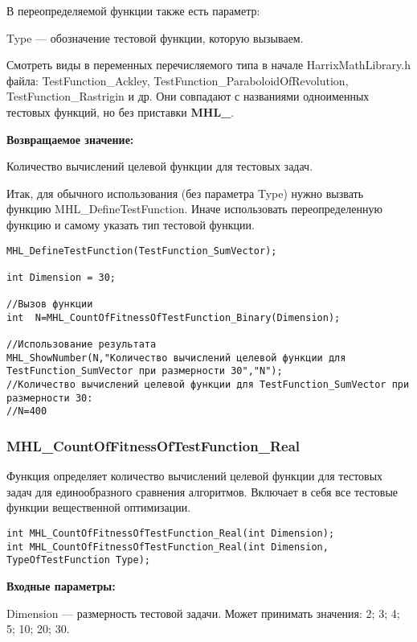 \documentclass[a4paper,12pt]{article}
\begin{document}
В переопределяемой функции также есть параметр:
  
Type --- обозначение тестовой функции, которую вызываем. 

Смотреть виды в переменных перечисляемого типа в начале HarrixMathLibrary.h файла: TestFunction\_Ackley, TestFunction\_ParaboloidOfRevolution, TestFunction\_Rastrigin и др. Они совпадают с названиями одноименных тестовых функций, но без приставки \textbf{MHL\_}.

\textbf{Возвращаемое значение:}
 
Количество вычислений целевой функции для тестовых задач.

Итак, для обычного использования (без параметра Type) нужно вызвать функцию MHL\_DefineTestFunction. Иначе использовать переопределенную функцию и самому указать тип тестовой функции.


\begin{lstlisting}[label=code_use_MHL_CountOfFitnessOfTestFunction_Binary,caption=Пример использования]
MHL_DefineTestFunction(TestFunction_SumVector);

int Dimension = 30;

//Вызов функции
int  N=MHL_CountOfFitnessOfTestFunction_Binary(Dimension);

//Использование результата
MHL_ShowNumber(N,"Количество вычислений целевой функции для TestFunction_SumVector при размерности 30","N");
//Количество вычислений целевой функции для TestFunction_SumVector при размерности 30:
//N=400
\end{lstlisting}

\subsubsection{MHL\_CountOfFitnessOfTestFunction\_Real}\label{MHL_CountOfFitnessOfTestFunction_Real}

Функция определяет количество вычислений целевой функции для тестовых задач для единообразного сравнения алгоритмов. Включает в себя все тестовые функции вещественной оптимизации.


\begin{lstlisting}[label=code_syntax_MHL_CountOfFitnessOfTestFunction_Real,caption=Синтаксис]
int MHL_CountOfFitnessOfTestFunction_Real(int Dimension);
int MHL_CountOfFitnessOfTestFunction_Real(int Dimension, TypeOfTestFunction Type);
\end{lstlisting}

\textbf{Входные параметры:}

Dimension --- размерность тестовой задачи. Может принимать значения: 2; 3; 4; 5; 10; 20; 30.
\end{document}

